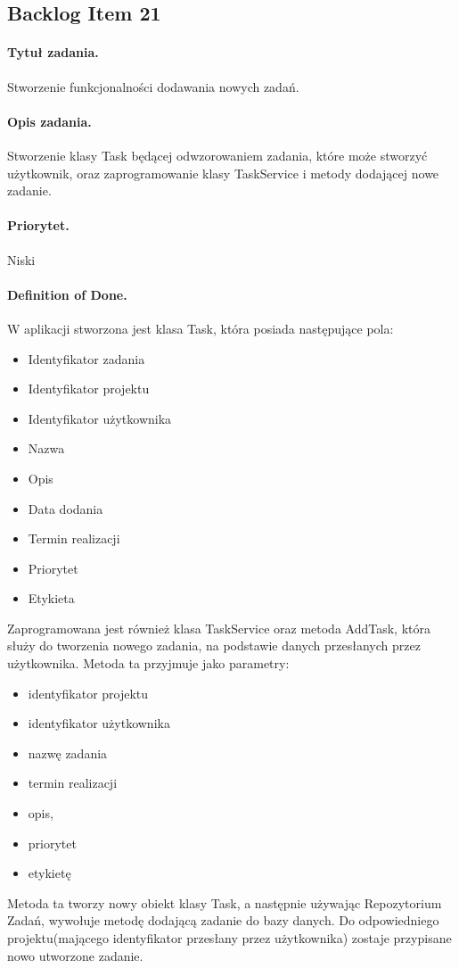 \documentclass[a4paper]{article}
\begin{document}
\subsection{Backlog Item 21} 
\paragraph{Tytuł zadania.}  Stworzenie funkcjonalności dodawania nowych zadań.
\paragraph{Opis zadania.} Stworzenie klasy Task będącej odwzorowaniem zadania, które może stworzyć użytkownik, oraz zaprogramowanie klasy TaskService i metody dodającej nowe zadanie.
\paragraph{Priorytet.} Niski
\paragraph{Definition of Done.} W aplikacji stworzona jest klasa Task, która posiada następujące pola:
\begin{itemize}
\item Identyfikator zadania
\item Identyfikator projektu
\item Identyfikator użytkownika
\item Nazwa
\item Opis
\item Data dodania
\item Termin realizacji
\item Priorytet
\item Etykieta
\end{itemize}
Zaprogramowana jest również klasa TaskService oraz metoda AddTask, która służy do tworzenia nowego zadania, na podstawie danych przesłanych przez użytkownika. Metoda ta przyjmuje jako parametry:
\begin{itemize}
\item identyfikator projektu
\item identyfikator użytkownika
\item nazwę zadania
\item termin realizacji
\item opis, 
\item priorytet
\item etykietę
\end{itemize}
Metoda ta tworzy nowy obiekt klasy Task, a następnie używając Repozytorium Zadań, wywołuje metodę dodającą zadanie do bazy danych. Do odpowiedniego projektu(mającego identyfikator przesłany przez użytkownika) zostaje przypisane nowo utworzone zadanie.
\end{document}
